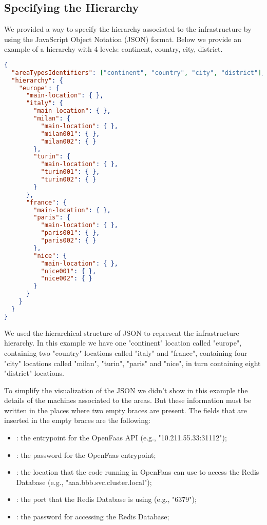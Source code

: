 \subsection{Specifying the Hierarchy}
We provided a way to specify the hierarchy associated to the infrastructure by using the JavaScript Object Notation (JSON) format.
Below we provide an example of a hierarchy with 4 levels: continent, country, city, district.

\begin{lstlisting}[language=json,firstnumber=1]
{
  "areaTypesIdentifiers": ["continent", "country", "city", "district"],
  "hierarchy": {
    "europe": {
      "main-location": { },
      "italy": {
        "main-location": { },
        "milan": {
          "main-location": { },
          "milan001": { },
          "milan002": { }
        },
        "turin": {
          "main-location": { },
          "turin001": { },
          "turin002": { }
        }
      },
      "france": {
        "main-location": { },
        "paris": {
          "main-location": { },
          "paris001": { },
          "paris002": { }
        },
        "nice": {
          "main-location": { },
          "nice001": { },
          "nice002": { }
        }
      }
    }
  }
}
\end{lstlisting}

We used the hierarchical structure of JSON to represent the infrastructure hierarchy. In this example we have one "continent" location called "europe", containing two "country" locations called "italy" and "france", containing four "city" locations called "milan", "turin", "paris" and "nice", in turn containing eight "district" locations.

To simplify the visualization of the JSON we didn't show in this example the details of the machines associated to the areas. But these information must be written in the places where two empty braces \inlinecode{\{ \}} are present. The fields that are inserted in the empty braces are the following:

\begin{itemize}
    \item {}: the entrypoint for the OpenFaas API (e.g., "10.211.55.33:31112");
    \item {}: the password for the OpenFaas entrypoint;
    \item {}: the location that the code running in OpenFaas can use to access the Redis Database (e.g., "aaa.bbb.svc.cluster.local");
    \item {}: the port that the Redis Database is using (e.g., "6379");
    \item {}: the password for accessing the Redis Database;
\end{itemize}


